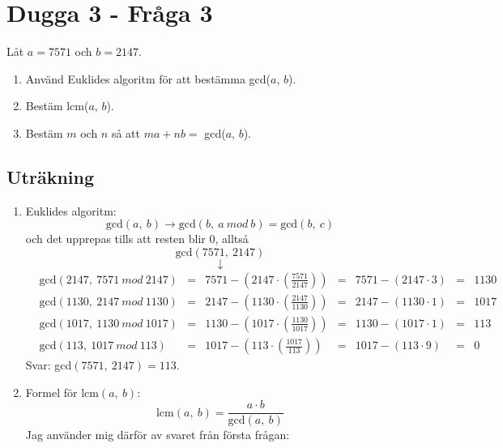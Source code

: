 \documentclass[a4paper,12pt]{article}
\begin{document}
\section{Dugga 3 - Fråga 3}
Låt $a = 7571$ och $b = 2147$.
\begin{enumerate}[label=\alph*)]
    \item Använd Euklides algoritm för att bestämma gcd($a$, $b$).
    \item Bestäm lcm($a$, $b$).
    \item Bestäm $m$ och $n$ så att $ma + nb = $ gcd($a$, $b$).
\end{enumerate}
\subsection*{Uträkning}
\begin{enumerate}[label=\alph*)]
    \item Euklides algoritm: 
    \begin{displaymath}
        \text{gcd}(a,~b) \rightarrow \text{gcd}(b,~a~mod~b) = \text{gcd}(b,~c)
    \end{displaymath}
    och det upprepas tills att resten blir $0$, alltså
    \begin{displaymath}
        \text{gcd}(7571,~2147)
    \end{displaymath}
    \begin{displaymath}
        \downarrow
    \end{displaymath}
    \begin{align}
        &\text{gcd}(2147,~7571~mod~2147) &=&
        7571 - (2147 \cdot (\frac{7571}{2147})) &=& 7571 - (2147 \cdot 3) &=& 1130 \label{gcd1} \\
        &\text{gcd}(1130,~2147~mod~1130) &=& 2147 - (1130 \cdot
        (\frac{2147}{1130})) &=& 2147 - (1130 \cdot 1) &=& 1017 \label{gcd2} \\
        &\text{gcd}(1017,~1130~mod~1017) &=& 1130 - (1017 \cdot (\frac{1130}{1017})) &=& 1130 - (1017 \cdot 1) &=& 113 \label{gcd3} \\
        &\text{gcd}(113,~1017~mod~113) &=& 1017 - (113 \cdot (\frac{1017}{113})) &=& 1017 - (113 \cdot 9) &=& 0
    \end{align}
    Svar: gcd$(7571,~2147) = 113$.
    \item Formel för lcm$(a,~b)$:
    \begin{displaymath}
        \text{lcm}(a,~b) = \frac{a \cdot b}{\text{gcd}(a,~b)}
    \end{displaymath}
    Jag använder mig därför av svaret från första frågan:

\end{enumerate}
\end{document}
